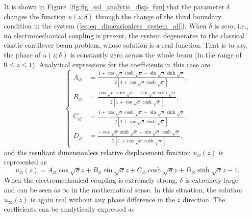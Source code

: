 \documentclass{svjour3}                     %
\begin{document}
It is shown in Figure~\ref{fig:fig_sol_analytic_disp_fun} that the parameter $\delta$ changes the function $u(z;\delta)$ through the change of the third boundary condition in the system (\ref{eq:eq_dimensionless_system_all}). When $\delta$ is zero, i.e., no electromechanical coupling is present, the system degenerates to the classical elastic cantilever beam problem, whose solution is a real function. That is to say, the phase of $u(z;\delta)$ is constantly zero across the whole beam (in the range of $0 \leq z \leq 1$).
Analytical expressions for the coefficients in this case are 
\begin{equation}
    \left\{\begin{aligned}
        A_{\varnothing} &= \frac{ 1 + \cos\sqrt{\sigma } \cosh\sqrt{\sigma } - \sin\sqrt{\sigma } \sinh\sqrt{\sigma} }{2 \left[ 1 + \cos\sqrt{\sigma } \cosh\sqrt{\sigma } \right]}, \\
        B_{\varnothing} &= \frac{ \cos\sqrt{\sigma } \sinh\sqrt{\sigma } + \sin\sqrt{\sigma } \cosh\sqrt{\sigma} }{2 \left[ 1 + \cos\sqrt{\sigma } \cosh\sqrt{\sigma } \right]}, \\
        C_{\varnothing} &= \frac{ 1 + \cos\sqrt{\sigma } \cosh\sqrt{\sigma } + \sin\sqrt{\sigma } \sinh\sqrt{\sigma} }{2 \left[ 1 + \cos\sqrt{\sigma } \cosh\sqrt{\sigma } \right]}, \\
        D_{\varnothing} &= \frac{ -\cos\sqrt{\sigma } \sinh\sqrt{\sigma } - \sin\sqrt{\sigma } \cosh\sqrt{\sigma} }{2 \left[ 1 + \cos\sqrt{\sigma } \cosh\sqrt{\sigma } \right]},
    \end{aligned}\right.
    \label{eq:eq_disp_func_coeffs_exps_zero}
\end{equation}
and the resultant dimensionless relative displacement function $u_{\varnothing} (z)$ is represented as
\begin{equation}
    u_{\varnothing} (z) = A_{\varnothing} \cos{\sqrt{\sigma}z} + B_{\varnothing} \sin{\sqrt{\sigma}z} + C_{\varnothing} \cosh{\sqrt{\sigma}z} + D_{\varnothing} \sinh{\sqrt{\sigma}z} - 1.
\end{equation}
When the electromechanical coupling is extremely strong, $\delta$ is extremely large and can be seen as $\infty$ in the mathematical sense. In this situation, the solution $u_\infty (z)$ is again real without any phase difference in the $z$ direction. The coefficients can be analytically expressed as 
\end{document}
